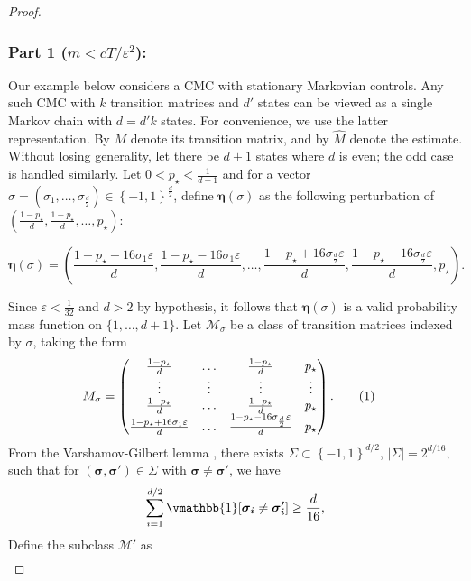 \documentclass[opre,sglanonrev]{informs4}
\numberwithin{equation}{section}
\newcommand{\lp}{\left(}
\newcommand{\rp}{\right)}
\newcommand{\lc}{\left\{}
\newcommand{\rc}{\right\}}
\newcommand{\Mcal}{\mathcal{M}}
\newcommand\numberthis{\addtocounter{equation}{1}\tag{\theequation}}
\newcommand{\indicator}{\vmathbb{1}}
\newcommand{\abs}[1]{\left| #1 \right|}
\newcommand{\etab}{\boldsymbol{\eta}}
\newcommand{\eps}{\varepsilon}
\renewcommand{\epsilon}{\eps}
\begin{document}
\begin{APPENDICES}
{\begin{proof}
\subsubsection*{Part 1 ($m < cT/\eps^2$):}
Our example below considers a CMC with stationary Markovian controls. Any such CMC with $k$ transition matrices and $d'$ states
can be viewed as a single Markov chain with $d=d'k$ states. 
For convenience, we use the latter representation. By ${M}$ denote its transition matrix, and by $\hat M$ denote the estimate.
Without losing generality, let there be $d+1$ states where $d$ is even; the odd case is handled similarly. 
Let $0<p_\star<\frac{1}{d+1}$ and for a vector $\sigma=\lp\sigma_1,\dots,\sigma_{\frac{d}{2}}\rp\in\lc -1,1\rc^\frac{d}{2}$, define $\etab(\sigma)$ as the following perturbation of $\left( \frac{1-p_\star}{d},  \frac{1-p_\star}{d},\dots, p_\star \right)$:
\begin{small}
\[
\etab(\sigma) = \left( \frac{1 - p_\star + 16 \sigma_1 \eps}{d}, \frac{1 - p_\star - 16 \sigma_1 \eps}{d}, \dots, \frac{1 - p_\star + 16 \sigma_{\frac{d}{2}} \eps}{d}, \frac{1 - p_\star - 16 \sigma_{\frac{d}{2}} \eps}{d} , p_\star \right).
\]
\end{small}
Since $\epsilon<\frac{1}{32}$ and $d>2$ by hypothesis, it follows that $\etab(\sigma)$ is a valid probability mass function on $\{1,\dots,d+1\}$.
Let $\Mcal_{\sigma}$ be a class of transition matrices indexed by $\sigma$, taking the form
\begin{align*}
 M_{\sigma} & = \begin{pmatrix}
 \frac{1-p_{\star}}{d} & \hdots & \frac{1-p_{\star}}{d} & p_{\star} \\
  \vdots & \vdots & \vdots & \vdots\\
  \frac{1-p_{\star}}{d} & \hdots & \frac{1-p_{\star}}{d} & p_{\star} \\
  \frac{1 - p_\star + 16 \sigma_1 \eps}{d} & \hdots &  \frac{1 - p_\star - 16 \sigma_{\frac{d}{2}} \eps}{d} & p_{\star} 
\end{pmatrix}. \numberthis\label{eq:mm-p1eq5}
\end{align*}
From the Varshamov-Gilbert lemma \citep[Theorem 5.1.7]{van2012introduction},  there exists
$ \Sigma \subset \lc-1,1\rc^{d/2}$, $\abs{\Sigma} = 2^{d/16}$, such that
for $(\boldsymbol{\sigma}, \boldsymbol{\sigma}') \in \Sigma$ with $\boldsymbol{\sigma} \neq \boldsymbol{\sigma}'$,
we have
\[
\sum_{i=1}^{d/2}\indicator[\boldsymbol{\sigma_i}\neq \boldsymbol{\sigma_i'}] \geq \frac{d}{16},
\] 
Define the subclass $\Mcal'$ as
\begin{align*}

\end{align*}
\end{proof}}
\end{APPENDICES}
\end{document}
